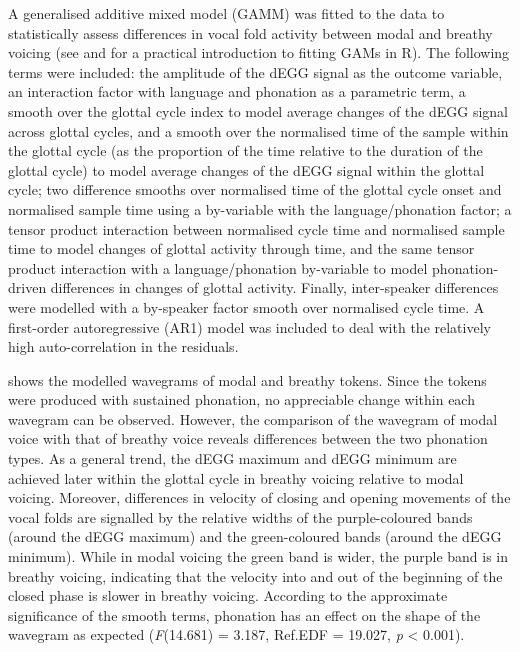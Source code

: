 \documentclass[
  11pt,
  a4paper,
]{article}
\begin{document}
A generalised additive mixed model (GAMM) was fitted to the data to
statistically assess differences in vocal fold activity between modal
and breathy voicing (see \citealt{soskuthy2017} and
\citealt{wieling2018} for a practical introduction to fitting GAMs in
R). The following terms were included: the amplitude of the dEGG signal
as the outcome variable, an interaction factor with language and
phonation as a parametric term, a smooth over the glottal cycle index to
model average changes of the dEGG signal across glottal cycles, and a
smooth over the normalised time of the sample within the glottal cycle
(as the proportion of the time relative to the duration of the glottal
cycle) to model average changes of the dEGG signal within the glottal
cycle; two difference smooths over normalised time of the glottal cycle
onset and normalised sample time using a by-variable with the
language/phonation factor; a tensor product interaction between
normalised cycle time and normalised sample time to model changes of
glottal activity through time, and the same tensor product interaction
with a language/phonation by-variable to model phonation-driven
differences in changes of glottal activity. Finally, inter-speaker
differences were modelled with a by-speaker factor smooth over
normalised cycle time. A first-order autoregressive (AR1) model was
included to deal with the relatively high auto-correlation in the
residuals.

 shows the modelled wavegrams of modal and breathy
tokens. Since the tokens were produced with sustained phonation, no
appreciable change within each wavegram can be observed. However, the
comparison of the wavegram of modal voice with that of breathy voice
reveals differences between the two phonation types. As a general trend,
the dEGG maximum and dEGG minimum are achieved later within the glottal
cycle in breathy voicing relative to modal voicing. Moreover,
differences in velocity of closing and opening movements of the vocal
folds are signalled by the relative widths of the purple-coloured bands
(around the dEGG maximum) and the green-coloured bands (around the dEGG
minimum). While in modal voicing the green band is wider, the purple
band is in breathy voicing, indicating that the velocity into and out of
the beginning of the closed phase is slower in breathy voicing.
According to the approximate significance of the smooth terms, phonation
has an effect on the shape of the wavegram as expected (\emph{F}(14.681)
= 3.187, Ref.EDF = 19.027, \emph{p} \textless{} 0.001).
\end{document}
